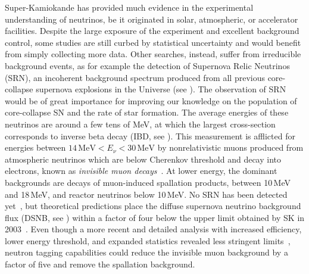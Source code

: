 Super-Kamiokande has provided %
much evidence in the experimental understanding of neutrinos, %
be it originated in solar, atmospheric, or accelerator facilities.
Despite the large exposure of the experiment and excellent background control, %
some studies are still curbed by statistical uncertainty and would benefit from simply collecting more data.
Other searches, instead, suffer from irreducible background events, as for example the detection of Supernova Relic Neutrinos (SRN), %
an incoherent background spectrum produced from all previous core-collapse supernova explosions in the Universe (see ).
The observation of SRN would be of great importance for improving our knowledge on the population of core-collapse SN %
and the rate of star formation.
The average energies of these neutrinos are around a few tens of MeV, at which the largest cross-section %
corresponds to inverse beta decay (IBD, see ).
This measurement is afflicted for energies between $14\,\text{MeV} < E_\nu < 30\,\text{MeV}$ %
by nonrelativistic muons produced from atmospheric neutrinos which are below Cherenkov threshold and decay into electrons, %
known as \emph{invisible muon decays}~\cite{Kaplinghat:1999xi}.
At lower energy, the dominant backgrounds are decays of muon-induced spallation products, %
between 10\,MeV and 18\,MeV, and reactor neutrinos below 10\,MeV.
No SRN has been detected yet~\cite{Bays:2011si, Zhang:2013tua}, but %
theoretical predictions place the diffuse supernova neutrino background flux (DSNB, see ) %
within a factor of four below the upper limit obtained by SK in 2003~\cite{Malek:2002ns, Horiuchi:2008jz}.
Even though a more recent and detailed analysis with increased efficiency, lower energy threshold, and expanded statistics %
revealed less stringent limits~\cite{Bays:2011si}, neutron tagging capabilities could reduce %
the invisible muon background by a factor of five and remove the spallation background.

